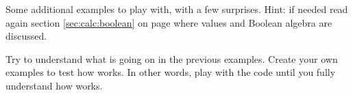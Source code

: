 \documentclass[krantz2]{krantz}\usepackage{knitr}%
\begin{document}
\begin{playground}
Some additional examples to play with, with a few surprises. Hint: if needed read again section \ref{sec:calc:boolean} on page \pageref{sec:calc:boolean} where  values and Boolean algebra are discussed.

\begin{knitrout}\footnotesize
{}\color{fgcolor}\begin{kframe}
\begin{alltt}
 \hlkwb{<-} \hlopt{:}
 \hlopt{>} \hlstd{,} \hlstd{,} \hlopt{-}\hlstd{)}
 \hlopt{>}  \hlopt{+}  \hlopt{-} \hlstd{)}
\hlstd{(} \hlopt{>}  \hlopt{+}  \hlopt{-} \hlstd{)} 
\hlstd{(}\hlstd{(} \hlopt{+}  \hlopt{-} \hlstd{)} 
\hlstd{(} \hlopt{+}  \hlopt{-} \hlstd{)} 
\end{alltt}
\end{kframe}
\end{knitrout}
Try to understand what is going on in the previous examples. Create your own examples to test how  works. In other words, play with the code until you fully understand how  works.
\end{playground}
\end{document}
